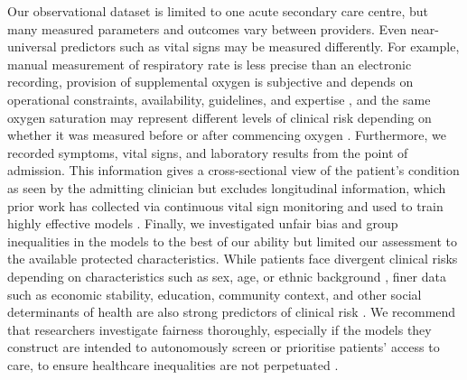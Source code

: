 \documentclass[fleqn,10pt]{wlscirep}
\begin{document}
Our observational dataset is limited to one acute secondary care centre, but many measured parameters and outcomes vary between providers. Even near-universal predictors such as vital signs may be measured differently. For example, manual measurement of respiratory rate is less precise than an electronic recording\cite{Kellett11}, provision of supplemental oxygen is subjective and depends on operational constraints, availability, guidelines, and expertise \cite{Kasereka20}, and the same oxygen saturation may represent different levels of clinical risk depending on whether it was measured before or after commencing oxygen \cite{Cuthbertson07}. Furthermore, we recorded symptoms, vital signs, and laboratory results from the point of admission. This information gives a cross-sectional view of the patient’s condition as seen by the admitting clinician but excludes longitudinal information, which prior work has collected via continuous vital sign monitoring and used to train highly effective models \cite{Kao21, Lundberg18}. Finally, we investigated unfair bias and group inequalities in the models to the best of our ability but limited our assessment to the available protected characteristics. While patients face divergent clinical risks depending on characteristics such as sex, age, or ethnic background \cite{Iezzoni13C3}, finer data such as economic stability, education, community context, and other social determinants of health are also strong predictors of clinical risk \cite{Mahmoudi20}. We recommend that researchers investigate fairness thoroughly, especially if the models they construct are intended to autonomously screen or prioritise patients’ access to care, to ensure healthcare inequalities are not perpetuated \cite{Yu19}.
\end{document}
